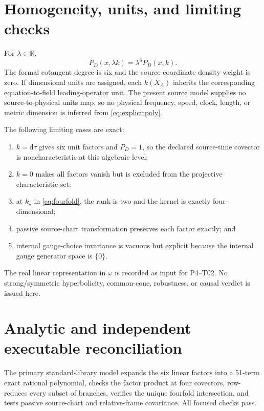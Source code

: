 \documentclass[11pt]{article}
\newcommand{\R}{\mathbb R}
\begin{document}
\section{Homogeneity, units, and limiting checks}

For $\lambda\in\R$,
\begin{equation}
 P_D(x,\lambda k)=\lambda^6P_D(x,k).
 \label{eq:homogeneous}
\end{equation}
The formal cotangent degree is six and the source-coordinate density weight is
zero.  If dimensional units are assigned, each $k(X_A)$ inherits the
corresponding equation-to-field leading-operator unit.  The present source
model supplies no source-to-physical units map, so no physical frequency,
speed, clock, length, or metric dimension is inferred from
\eqref{eq:explicitpoly}.

The following limiting cases are exact:
\begin{enumerate}[leftmargin=*]
 \item $k=\mathrm d\tau$ gives six unit factors and $P_D=1$, so the declared
 source-time covector is noncharacteristic at this algebraic level;
 \item $k=0$ makes all factors vanish but is excluded from the projective
 characteristic set;
 \item at $k_\star$ in \eqref{eq:fourfold}, the rank is two and the kernel is
 exactly four-dimensional;
 \item passive source-chart transformation preserves each factor exactly; and
 \item internal gauge-choice invariance is vacuous but explicit because the
 internal gauge generator space is $\{0\}$.
\end{enumerate}
The real linear representation in $\omega$ is recorded as input for P4--T02.
No strong/symmetric hyperbolicity, common-cone, robustness, or causal verdict
is issued here.

\section{Analytic and independent executable reconciliation}

The primary standard-library model expands the six linear factors into a
51-term exact rational polynomial, checks the factor product at four
covectors, row-reduces every subset of branches, verifies the unique fourfold
intersection, and tests passive source-chart and relative-frame covariance.
All focused checks pass.
\end{document}
